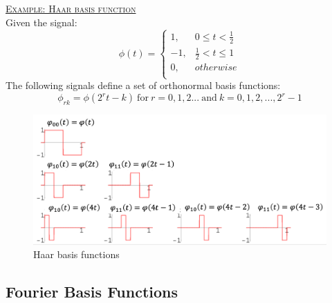\documentclass[12pt,a4paper]{article}
\begin{document}
\begin{tcolorbox}[breakable]
\underline{\textsc{Example: Haar basis function}}\\
Given the signal:
\[ \phi(t)=\begin{cases}
1, & 0 \leq t < \frac{1}{2}\\
-1, & \frac{1}{2} < t \leq 1\\
0, &otherwise\\
\end{cases} \]
The following signals define a set of orthonormal basis functions:
\[ \phi_{rk} = \phi(2^{r}t-k) \ \text{for} \ r=0,1,2... \ \text{and} \ k=0,1,2,...,2^{r}-1 \]
 \begin{figure}[H]\centering
 \includegraphics[width = \textwidth]{images/haar}
 \caption{Haar basis functions} \end{figure}
\end{tcolorbox}
\subsection{Fourier Basis Functions}
\end{document}
